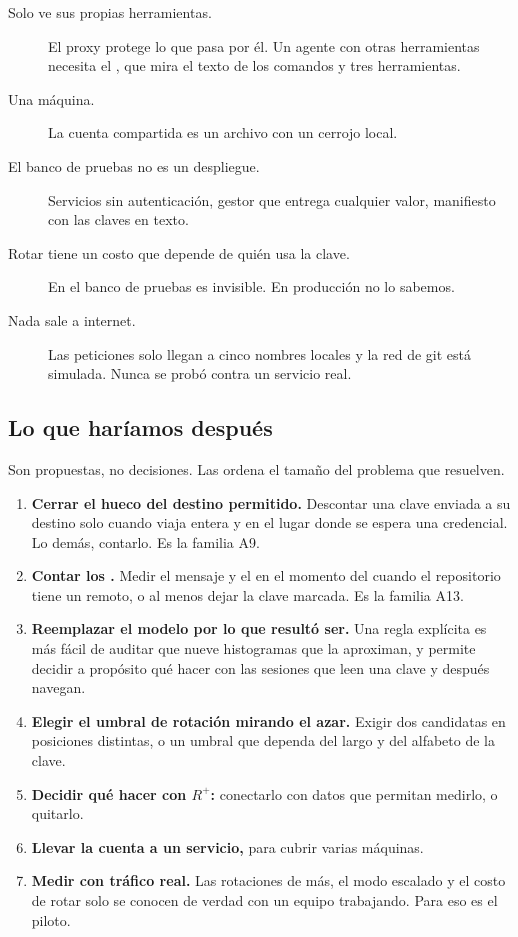 \begin{description}
  \item[Solo ve sus propias herramientas.] El proxy protege lo que pasa por él. Un agente con otras
    herramientas necesita el , que mira el texto de los comandos y tres herramientas.
  \item[Una máquina.] La cuenta compartida es un archivo con un cerrojo local.
  \item[El banco de pruebas no es un despliegue.] Servicios sin autenticación, gestor que entrega
    cualquier valor, manifiesto con las claves en texto.
  \item[Rotar tiene un costo que depende de quién usa la clave.] En el banco de pruebas es invisible.
    En producción no lo sabemos.
  \item[Nada sale a internet.] Las peticiones solo llegan a cinco nombres locales y la red de git está
    simulada. Nunca se probó contra un servicio real.
\end{description}

\subsection{Lo que haríamos después}

Son propuestas, no decisiones. Las ordena el tamaño del problema que resuelven.

\begin{enumerate}
  \item \textbf{Cerrar el hueco del destino permitido.} Descontar una clave enviada a su destino solo
    cuando viaja entera y en el lugar donde se espera una credencial. Lo demás, contarlo. Es la
    familia A9.
  \item \textbf{Contar los .} Medir el mensaje y el  en el momento del
     cuando el repositorio tiene un remoto, o al menos dejar la clave marcada. Es la
    familia A13.
  \item \textbf{Reemplazar el modelo por lo que resultó ser.} Una regla explícita es más fácil de
    auditar que nueve histogramas que la aproximan, y permite decidir a propósito qué hacer con las
    sesiones que leen una clave y después navegan.
  \item \textbf{Elegir el umbral de rotación mirando el azar.} Exigir dos candidatas en posiciones
    distintas, o un umbral que dependa del largo y del alfabeto de la clave.
  \item \textbf{Decidir qué hacer con $R^{+}$:} conectarlo con datos que permitan medirlo, o quitarlo.
  \item \textbf{Llevar la cuenta a un servicio,} para cubrir varias máquinas.
  \item \textbf{Medir con tráfico real.} Las rotaciones de más, el modo escalado y el costo de rotar
    solo se conocen de verdad con un equipo trabajando. Para eso es el piloto.
\end{enumerate}

